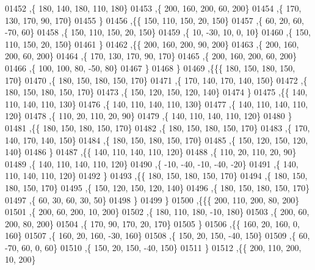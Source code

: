 \begin{DoxyCode}
01452     ,\{   180,   140,   180,   110,   180\}
01453     ,\{   200,   160,   200,    60,   200\}
01454     ,\{   170,   130,   170,    90,   170\}
01455     \}
01456    ,\{\{   150,   110,   150,    20,   150\}
01457     ,\{    60,    20,    60,   -70,    60\}
01458     ,\{   150,   110,   150,    20,   150\}
01459     ,\{    10,   -30,    10,     0,    10\}
01460     ,\{   150,   110,   150,    20,   150\}
01461     \}
01462    ,\{\{   200,   160,   200,    90,   200\}
01463     ,\{   200,   160,   200,    60,   200\}
01464     ,\{   170,   130,   170,    90,   170\}
01465     ,\{   200,   160,   200,    60,   200\}
01466     ,\{   100,   100,    80,   -50,    80\}
01467     \}
01468    \}
01469   ,\{\{\{   180,   150,   180,   150,   170\}
01470     ,\{   180,   150,   180,   150,   170\}
01471     ,\{   170,   140,   170,   140,   150\}
01472     ,\{   180,   150,   180,   150,   170\}
01473     ,\{   150,   120,   150,   120,   140\}
01474     \}
01475    ,\{\{   140,   110,   140,   110,   130\}
01476     ,\{   140,   110,   140,   110,   130\}
01477     ,\{   140,   110,   140,   110,   120\}
01478     ,\{   110,    20,   110,    20,    90\}
01479     ,\{   140,   110,   140,   110,   120\}
01480     \}
01481    ,\{\{   180,   150,   180,   150,   170\}
01482     ,\{   180,   150,   180,   150,   170\}
01483     ,\{   170,   140,   170,   140,   150\}
01484     ,\{   180,   150,   180,   150,   170\}
01485     ,\{   150,   120,   150,   120,   140\}
01486     \}
01487    ,\{\{   140,   110,   140,   110,   120\}
01488     ,\{   110,    20,   110,    20,    90\}
01489     ,\{   140,   110,   140,   110,   120\}
01490     ,\{   -10,   -40,   -10,   -40,   -20\}
01491     ,\{   140,   110,   140,   110,   120\}
01492     \}
01493    ,\{\{   180,   150,   180,   150,   170\}
01494     ,\{   180,   150,   180,   150,   170\}
01495     ,\{   150,   120,   150,   120,   140\}
01496     ,\{   180,   150,   180,   150,   170\}
01497     ,\{    60,    30,    60,    30,    50\}
01498     \}
01499    \}
01500   ,\{\{\{   200,   110,   200,    80,   200\}
01501     ,\{   200,    60,   200,    10,   200\}
01502     ,\{   180,   110,   180,   -10,   180\}
01503     ,\{   200,    60,   200,    80,   200\}
01504     ,\{   170,    90,   170,    20,   170\}
01505     \}
01506    ,\{\{   160,    20,   160,     0,   160\}
01507     ,\{   160,    20,   160,   -30,   160\}
01508     ,\{   150,    20,   150,   -40,   150\}
01509     ,\{    60,   -70,    60,     0,    60\}
01510     ,\{   150,    20,   150,   -40,   150\}
01511     \}
01512    ,\{\{   200,   110,   200,    10,   200\}

\end{DoxyCode}
